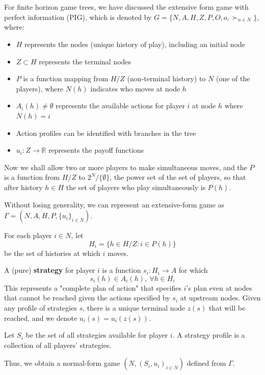 \documentclass[11pt]{elegantbook_2}
\begin{document}
For finite horizon game trees, we have discussed the extensive form game with perfect information (PIG), which is denoted by $G=\{N,A,H,Z,P,O,o,\succ_{n\in N}\}$, where:
\begin{itemize}
    \item $H$ represents the nodes (unique history of play), including an initial node
    \item $Z \subset H$ represents the terminal nodes
    \item $P$ is a function mapping from $H/Z$ (non-terminal history) to $N$ (one of the players), where $N(h)$ indicates who moves at node $h$
    \item $A_i(h) \neq \emptyset$ represents the available actions for player $i$ at node $h$ where $N(h) = i$
    \item Action profiles can be identified with branches in the tree
    \item $u_i: Z \rightarrow \mathbb{R}$ represents the payoff functions
\end{itemize}

Now we shall allow two or more players to make simultaneous moves, and the $P$ is a function from $H/Z$ to $2^N/\{\emptyset\}$, the power set of the set of players, so that after history $h \in H$ the set of players who play simultaneously is $P(h)$.

Without losing generality, we can represent an extensive-form game as $\Gamma=\left(N,A,H,P,\{u_i\}_{i\in N}\right)$.

For each player $i \in N$, let $$H_i=\{h\in H/Z:i\in P(h)\}$$ be the set of histories at which $i$ moves.

A (pure) \textbf{strategy} for player $i$ is a function $s_i : H_i \rightarrow A$ for which $$s_i(h)\in A_i(h),\ \forall h\in H_i$$
This represents a "complete plan of action" that specifies $i$'s plan even at nodes that cannot be reached given the actions specified by $s_i$ at upstream nodes. Given any profile of strategies $s$, there is a unique terminal node $z(s)$ that will be reached, and we denote $u_i(s) = u_i(z(s))$.

Let $S_i$ be the set of all strategies available for player $i$. A strategy profile is a collection of all players' strategies.

Thus, we obtain a normal-form game $(N,(S_i, u_i)_{i\in N})$ defined from $\Gamma$.
\end{document}
